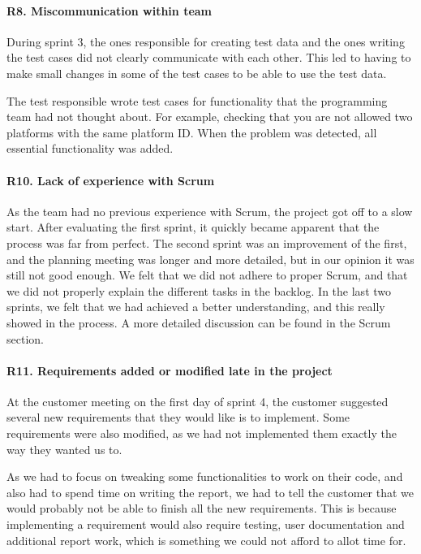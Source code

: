 \paragraph{R8. Miscommunication within team}
During sprint 3, the ones responsible for creating test data and the ones writing the test cases did not clearly communicate with each other. This led to having to make small changes in some of the test cases to be able to use the test data.

The test responsible wrote test cases for functionality that the programming team had not thought about. For example, checking that you are not allowed two platforms with the same platform ID.
When the problem was detected, all essential functionality was added.

\paragraph{R10. Lack of experience with Scrum}
As the team had no previous experience with Scrum, the project got off to a slow start.
After evaluating the first sprint, it quickly became apparent that the process was far from perfect.
The second sprint was an improvement of the first, and the planning meeting was longer and more detailed, but in our opinion it was still not good enough. We felt that we did not adhere to proper Scrum, and that we did not properly explain the different tasks in the backlog. In the last two sprints, we felt that we had achieved a better understanding, and this really showed in the process. A more detailed discussion can be found in the Scrum section.

\paragraph{R11. Requirements added or modified late in the project}
At the customer meeting on the first day of sprint 4, the customer suggested several new requirements that they would like is to implement. Some requirements were also modified, as we had not implemented them exactly the way they wanted us to.

As we had to focus on tweaking some functionalities to work on their code, and also had to spend time on writing the report, we had to tell the customer that we would probably not be able to finish all the new requirements. This is because implementing a requirement would also require testing, user documentation and additional report work, which is something we could not afford to allot time for.


